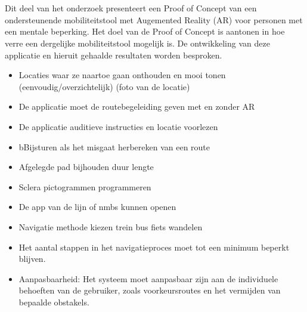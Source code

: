 
\chapter{}%
\label{ch:proof-of-concept}

Dit deel van het onderzoek presenteert een Proof of Concept van een ondersteunende mobiliteitstool met Augemented Reality (AR) voor personen met een mentale beperking. Het doel van de Proof of Concept is aantonen in hoe verre een dergelijke mobiliteitstool mogelijk is. De ontwikkeling van deze applicatie en hieruit gehaalde resultaten worden besproken.

\begin{itemize}
    \item Locaties waar ze naartoe gaan onthouden en mooi tonen (eenvoudig/overzichtelijk) (foto van de locatie)
    \item De applicatie moet de routebegeleiding geven met en zonder AR
    \item De applicatie auditieve instructies en locatie voorlezen
    \item bBijsturen als het misgaat herbereken van een route
    \item Afgelegde pad bijhouden duur lengte 
    \item Sclera pictogrammen programmeren
    \item De app van de lijn of nmbs kunnen openen
    \item Navigatie methode kiezen trein bus fiets wandelen
    \item Het aantal stappen in het navigatieproces moet tot een minimum beperkt blijven.
    \item Aanpasbaarheid: Het systeem moet aanpasbaar zijn aan de individuele behoeften van de gebruiker, zoals voorkeursroutes en het vermijden van bepaalde obstakels.
\end{itemize}




